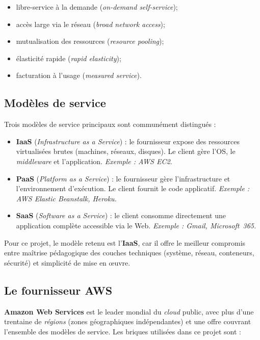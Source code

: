 \begin{itemize}
  \item libre-service à la demande (\textit{on-demand self-service});
  \item accès large via le réseau (\textit{broad network access});
  \item mutualisation des ressources (\textit{resource pooling});
  \item élasticité rapide (\textit{rapid elasticity});
  \item facturation à l'usage (\textit{measured service}).
\end{itemize}

\subsection{Modèles de service}

Trois modèles de service principaux sont communément distingués :

\begin{itemize}
  \item \textbf{IaaS} (\textit{Infrastructure as a Service}) : le
        fournisseur expose des ressources virtualisées brutes
        (machines, réseaux, disques). Le client gère l'OS, le \emph{middleware}
        et l'application. \emph{Exemple : AWS EC2.}
  \item \textbf{PaaS} (\textit{Platform as a Service}) : le fournisseur
        gère l'infrastructure et l'environnement d'exécution. Le client
        fournit le code applicatif. \emph{Exemple : AWS Elastic Beanstalk,
        Heroku.}
  \item \textbf{SaaS} (\textit{Software as a Service}) : le client
        consomme directement une application complète accessible via le
        Web. \emph{Exemple : Gmail, Microsoft~365.}
\end{itemize}

Pour ce projet, le modèle retenu est l'\textbf{IaaS}, car il offre le
meilleur compromis entre maîtrise pédagogique des couches techniques
(système, réseau, conteneurs, sécurité) et simplicité de mise en
\oe{}uvre.

\subsection{Le fournisseur AWS}

\textbf{Amazon Web Services} est le leader mondial du \emph{cloud}
public, avec plus d'une trentaine de \emph{régions} (zones
géographiques indépendantes) et une offre couvrant l'ensemble des
modèles de service. Les briques utilisées dans ce projet sont :

